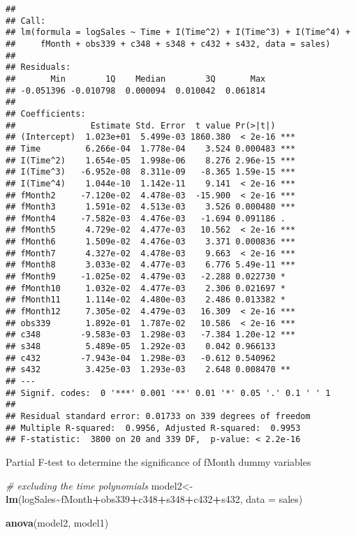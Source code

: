 \documentclass[
]{article}
\newenvironment{Shaded}{\begin{snugshade}}{\end{snugshade}}
\newcommand{\AttributeTok}[1]{\textcolor[rgb]{0.13,0.29,0.53}{#1}}
\newcommand{\CommentTok}[1]{\textcolor[rgb]{0.56,0.35,0.01}{\textit{#1}}}
\newcommand{\FunctionTok}[1]{\textcolor[rgb]{0.13,0.29,0.53}{\textbf{#1}}}
\newcommand{\NormalTok}[1]{#1}
\newcommand{\OtherTok}[1]{\textcolor[rgb]{0.56,0.35,0.01}{#1}}
\newcommand{\SpecialCharTok}[1]{\textcolor[rgb]{0.81,0.36,0.00}{\textbf{#1}}}
\begin{document}
\begin{verbatim}
## 
## Call:
## lm(formula = logSales ~ Time + I(Time^2) + I(Time^3) + I(Time^4) + 
##     fMonth + obs339 + c348 + s348 + c432 + s432, data = sales)
## 
## Residuals:
##       Min        1Q    Median        3Q       Max 
## -0.051396 -0.010798  0.000094  0.010042  0.061814 
## 
## Coefficients:
##               Estimate Std. Error  t value Pr(>|t|)    
## (Intercept)  1.023e+01  5.499e-03 1860.380  < 2e-16 ***
## Time         6.266e-04  1.778e-04    3.524 0.000483 ***
## I(Time^2)    1.654e-05  1.998e-06    8.276 2.96e-15 ***
## I(Time^3)   -6.952e-08  8.311e-09   -8.365 1.59e-15 ***
## I(Time^4)    1.044e-10  1.142e-11    9.141  < 2e-16 ***
## fMonth2     -7.120e-02  4.478e-03  -15.900  < 2e-16 ***
## fMonth3      1.591e-02  4.513e-03    3.526 0.000480 ***
## fMonth4     -7.582e-03  4.476e-03   -1.694 0.091186 .  
## fMonth5      4.729e-02  4.477e-03   10.562  < 2e-16 ***
## fMonth6      1.509e-02  4.476e-03    3.371 0.000836 ***
## fMonth7      4.327e-02  4.478e-03    9.663  < 2e-16 ***
## fMonth8      3.033e-02  4.477e-03    6.776 5.49e-11 ***
## fMonth9     -1.025e-02  4.479e-03   -2.288 0.022730 *  
## fMonth10     1.032e-02  4.477e-03    2.306 0.021697 *  
## fMonth11     1.114e-02  4.480e-03    2.486 0.013382 *  
## fMonth12     7.305e-02  4.479e-03   16.309  < 2e-16 ***
## obs339       1.892e-01  1.787e-02   10.586  < 2e-16 ***
## c348        -9.583e-03  1.298e-03   -7.384 1.20e-12 ***
## s348         5.489e-05  1.292e-03    0.042 0.966133    
## c432        -7.943e-04  1.298e-03   -0.612 0.540962    
## s432         3.425e-03  1.293e-03    2.648 0.008470 ** 
## ---
## Signif. codes:  0 '***' 0.001 '**' 0.01 '*' 0.05 '.' 0.1 ' ' 1
## 
## Residual standard error: 0.01733 on 339 degrees of freedom
## Multiple R-squared:  0.9956, Adjusted R-squared:  0.9953 
## F-statistic:  3800 on 20 and 339 DF,  p-value: < 2.2e-16
\end{verbatim}

Partial F-test to determine the significance of fMonth dummy variables

\begin{Shaded}
\begin{Highlighting}[]
\CommentTok{\# excluding the time polynomials}
\NormalTok{model2}\OtherTok{\textless{}{-}}\FunctionTok{lm}\NormalTok{(logSales}\SpecialCharTok{\textasciitilde{}}\NormalTok{fMonth}\SpecialCharTok{+}\NormalTok{obs339}\SpecialCharTok{+}\NormalTok{c348}\SpecialCharTok{+}\NormalTok{s348}\SpecialCharTok{+}\NormalTok{c432}\SpecialCharTok{+}\NormalTok{s432, }\AttributeTok{data =}\NormalTok{ sales)}

\FunctionTok{anova}\NormalTok{(model2, model1)}
\end{Highlighting}
\end{Shaded}
\end{document}
